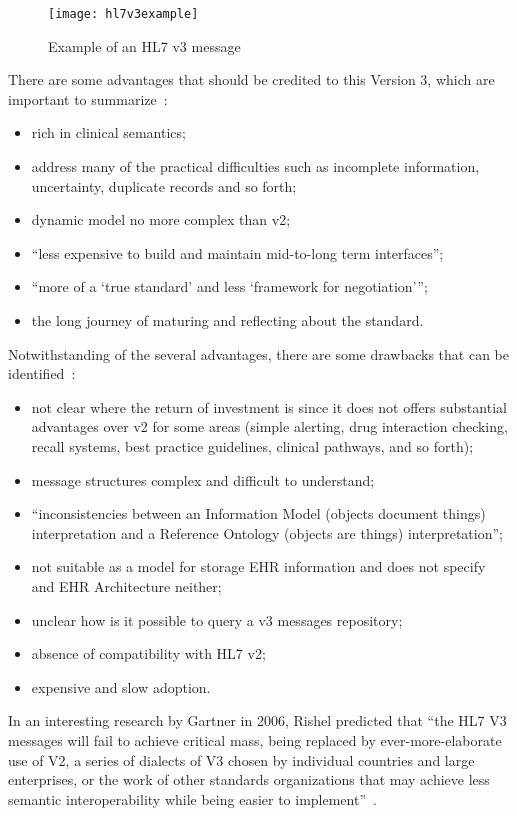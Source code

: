 \begin{figure}[t]
\centering
\texttt{[image: hl7v3example]}
\caption[Example of an HL7 v2 acknowledgement message]{Example of an HL7 v3 message~\citep{Spronk2007}}
\label{fig:hl7v3example}
\end{figure}

There are some advantages that should be credited to this Version 3, which are important to summarize~\citep{Atalag2010,Shaver2010}:
\begin{itemize}
\item rich in clinical semantics;
\item address many of the practical difficulties such as incomplete information, uncertainty, duplicate records and so forth;
\item dynamic model no more complex than v2;
\item ``less expensive to build and maintain mid-to-long term interfaces'';
\item ``more of a `true standard' and less `framework for negotiation''';
\item the long journey of maturing and reflecting about the standard.
\end{itemize}

Notwithstanding of the several advantages, there are some drawbacks that can be identified~\citep{Atalag2010,Shaver2010}:
\begin{itemize}
\item not clear where the return of investment is since it does not offers substantial advantages over v2 for some areas (simple alerting, drug interaction checking, recall systems, best practice guidelines, clinical pathways, and so forth);
\item message structures complex and difficult to understand;
\item ``inconsistencies between an Information Model (objects document things) interpretation and a Reference Ontology (objects are things) interpretation'';
\item not suitable as a model for storage EHR information and does not specify and EHR Architecture neither;
\item unclear how is it possible to query a v3 messages repository;
\item absence of compatibility with HL7 v2; 
\item expensive and slow adoption.
\end{itemize}

In an interesting research by Gartner in 2006, Rishel predicted that ``the HL7 V3 messages will fail to achieve critical mass, being replaced by ever-more-elaborate use of V2, a series of dialects of V3 chosen by individual countries and large enterprises, or the work of other standards organizations that may achieve less semantic interoperability while being easier to implement''~\citep{Rishel2006}.

